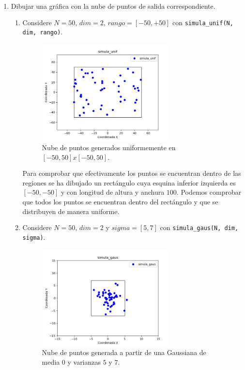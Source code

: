 \documentclass[size=a4, parskip=half, titlepage=false, toc=flat, toc=bib, 12pt]{scrartcl}
\begin{document}
\begin{enumerate}
\item Dibujar una gráfica con la nube de puntos de salida correspondiente.
\begin{enumerate}
\item Considere $N = 50$, $dim = 2$, $rango = [−50, +50]$ con \verb|simula_unif(N, dim, rango)|.
\begin{figure}[H]
\centering
{}
\includegraphics[width=0.7\textwidth]{./img/unif}
\caption{Nube de puntos generados uniformemente en $[-50,50]x[-50,50]$.}
\end{figure}
Para comprobar que efectivamente los puntos se encuentran dentro de las regiones se ha dibujado un rectángulo cuya esquina inferior izquierda es $[-50, -50]$ y con longitud de altura y anchura $100$. Podemos comprobar que todos los puntos se encuentran dentro del rectángulo y que se distribuyen de manera uniforme.
\item Considere $N = 50$, $dim = 2$ y $sigma = [5, 7]$ con \verb|simula_gaus(N, dim, sigma)|.
\begin{figure}[H]
\centering
{}
\includegraphics[width=0.7\textwidth]{./img/gauss}
\caption{Nube de puntos generada a partir de una Gaussiana de media $0$ y varianzas $5$ y $7$.}
\end{figure}


\end{enumerate}
\end{enumerate}
\end{document}
